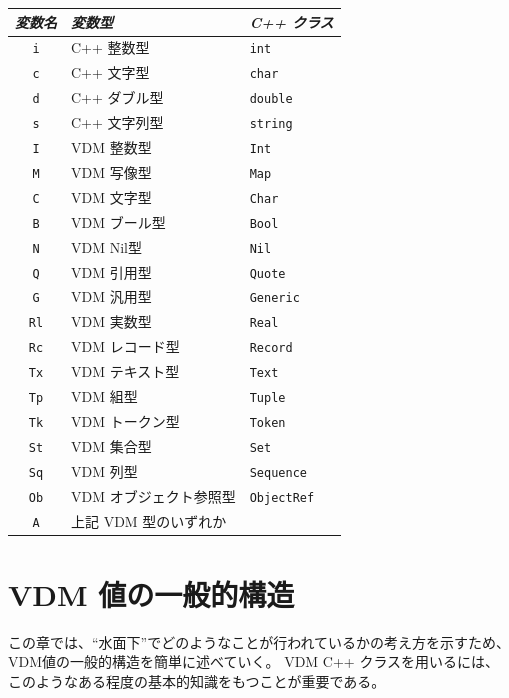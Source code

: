 \documentclass[\pformat,12pt]{jarticle}
\begin{document}
\begin{center}
\begin{longtable}{|c|l|l|} 
\hline
{\em 変数名} & {\em 変数型} & {\em C++ クラス} \\ \hline \hline
\endhead
\hline
\endfoot
{\tt i} & C++ 整数型 & {\tt int}\\
{\tt c} & C++ 文字型 & {\tt char}\\
{\tt d} & C++ ダブル型 & {\tt double}\\
{\tt s} & C++ 文字列型 & {\tt string}\\
{\tt I} & VDM 整数型  & {\tt Int}\\
{\tt M} & VDM 写像型 & {\tt Map}\\
{\tt C} & VDM 文字型 & {\tt Char}\\
{\tt B} & VDM ブール型 & {\tt Bool}\\
{\tt N} & VDM Nil型 & {\tt Nil}\\
{\tt Q} & VDM 引用型 & {\tt Quote}\\
{\tt G} & VDM 汎用型 & {\tt Generic}\\
{\tt Rl} & VDM 実数型 & {\tt Real}\\
{\tt Rc} & VDM レコード型 & {\tt Record}\\
{\tt Tx} & VDM テキスト型 & {\tt Text}\\
{\tt Tp} & VDM 組型 & {\tt Tuple}\\
{\tt Tk} & VDM トークン型 & {\tt Token}\\
{\tt St} & VDM 集合型 & {\tt Set}\\
{\tt Sq} & VDM 列型 & {\tt Sequence}\\ 
{\tt Ob} & VDM オブジェクト参照型 & {\tt ObjectRef}\\ 
{\tt A} & 上記 VDM 型のいずれか &\\
\end{longtable}
\end{center}


\section{VDM 値の一般的構造} \label{general-structure}

この章では、``水面下''でどのようなことが行われているかの考え方を示すため、VDM値の一般的構造を簡単に述べていく。
 VDM C++ クラスを用いるには、このようなある程度の基本的知識をもつことが重要である。
\end{document}
